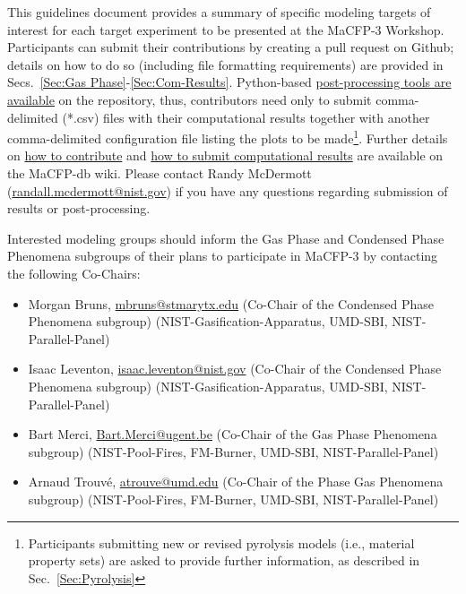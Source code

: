 \documentclass[12pt]{article}
\begin{document}
This guidelines document provides a summary of specific modeling targets of interest for each target experiment to be presented at the MaCFP-3 Workshop. Participants can submit their contributions by creating a pull request on Github; details on how to do so (including file formatting requirements) are provided in Secs.~\ref{Sec:Gas Phase}-\ref{Sec:Com-Results}. Python-based \href{https://github.com/MaCFP/macfp-db/wiki/Plotting-Scripts}{post-processing tools are available} on the repository, thus, contributors need only to submit comma-delimited (*.csv) files with their computational results together with another comma-delimited configuration file listing the plots to be made\footnote{Participants submitting new or revised pyrolysis models (i.e., material property sets) are asked to provide further information, as described in Sec.~\ref{Sec:Pyrolysis}}. Further details on \href{https://github.com/MaCFP/macfp-db/wiki/How-to-Contribute}{how to contribute} and \href{https://github.com/MaCFP/macfp-db/wiki/Submitting-Computational-Results}{how to submit computational results} are available on the MaCFP-db wiki.  Please contact Randy McDermott (\href{mailto:randall.mcdermott@nist.gov}{randall.mcdermott@nist.gov}) if you have any questions regarding submission of results or post-processing.

\newpage
Interested modeling groups should inform the Gas Phase and Condensed Phase Phenomena subgroups of their plans to participate in MaCFP-3 by contacting the following Co-Chairs:

\begin{itemize}[noitemsep]
\item Morgan Bruns, \href{mailto:mbruns@stmarytx.edu}{mbruns@stmarytx.edu} (Co-Chair of the Condensed Phase Phenomena subgroup) (NIST-Gasification-Apparatus, UMD-SBI, NIST-Parallel-Panel)
\item Isaac Leventon, \href{mailto:isaac.leventon@nist.gov}{isaac.leventon@nist.gov} (Co-Chair of the Condensed Phase Phenomena subgroup) (NIST-Gasification-Apparatus, UMD-SBI, NIST-Parallel-Panel)
\item Bart Merci, \href{mailto:Bart.Merci@ugent.be}{Bart.Merci@ugent.be} (Co-Chair of the Gas Phase Phenomena subgroup) (NIST-Pool-Fires, FM-Burner, UMD-SBI, NIST-Parallel-Panel)
\item Arnaud Trouv\'e, \href{mailto:atrouve@umd.edu}{atrouve@umd.edu} (Co-Chair of the Phase Gas Phenomena subgroup) (NIST-Pool-Fires, FM-Burner, UMD-SBI, NIST-Parallel-Panel)
 \end{itemize}
\end{document}
